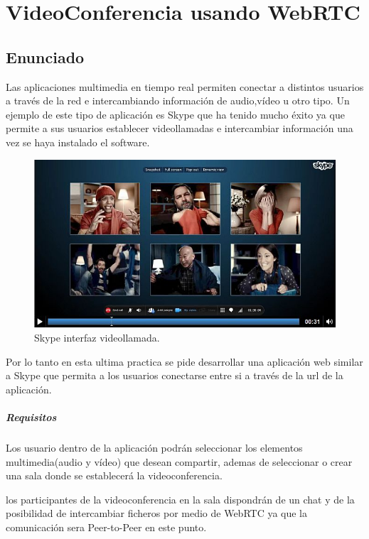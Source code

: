 \chapter{VideoConferencia usando WebRTC}
\section{Enunciado}
Las aplicaciones multimedia en tiempo real permiten conectar a distintos usuarios a través de la red e intercambiando información de audio,vídeo u otro tipo. Un ejemplo de este tipo de aplicación es Skype que ha tenido mucho éxito ya que permite a sus usuarios establecer videollamadas e intercambiar información una vez se haya instalado el software.
\begin{figure}[!h]
\begin{center}
   \includegraphics[width=0.9\linewidth]{Figures/skype}
	\decoRule
	\caption[Ejemplo sitio Web]{Skype interfaz videollamada.}
\label{fig:canvasPrimitivas}
\end{center}
\end{figure}

Por lo tanto en esta ultima practica se pide desarrollar una aplicación web similar a Skype que permita a los usuarios conectarse entre si a través de la url de la aplicación.
\paragraph{Requisitos}
Los usuario dentro de la aplicación podrán seleccionar los elementos multimedia(audio y vídeo) que desean compartir,   ademas de seleccionar o crear una sala donde se establecerá la videoconferencia. 

los participantes  de la videoconferencia en la sala  dispondrán de un chat y de la posibilidad de intercambiar ficheros por medio de WebRTC ya que la comunicación sera Peer-to-Peer en este punto.

